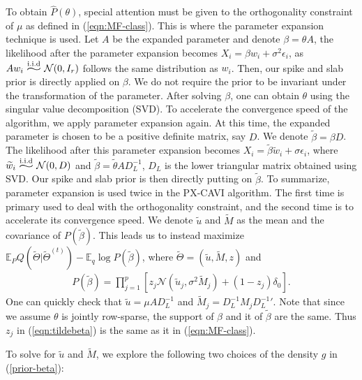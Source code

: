 \documentclass[pdftex, noinfoline, letter]{imsart}
\newcommand{\widesim}[2][2]{
	\mathrel{\overset{#2}{\scalebox{#1}[1]{$\sim$}}}
}
\theoremstyle{plain}
\begin{document}
To obtain $\widehat P(\theta)$, special attention must be given to the orthogonality constraint of $\mu$ as defined in (\ref{eqn:MF-class}). This is where the parameter expansion technique is used. Let $A$ be the expanded parameter and denote $\beta = \theta A$, the likelihood after the parameter expansion becomes $X_i = \beta w_i + \sigma^2 \epsilon_i$, as $A w_i \widesim{\text{i.i.d}} \mathcal{N}(0, I_r)$ follows the same distribution as $w_i$. Then, our spike and slab prior is directly applied on $\beta$. We do not require the prior to be invariant under the transformation of the parameter. 
After solving $\beta$, one can obtain $\theta$ using the singular value decomposition (SVD). 
To accelerate the convergence speed of the algorithm, we apply parameter expansion again. At this time, the expanded parameter is chosen to be a positive definite matrix, say $D$. 
We denote $\widetilde  \beta = \beta D$. The likelihood after this parameter expansion becomes 
$X_i = \widetilde  \beta \widetilde  w_i + \sigma \epsilon_i$, where $\widetilde  w_i \widesim{\text{i.i.d}} \mathcal{N}(0, D)$ and $\widetilde  \beta = \widetilde  \theta A D_L^{-1}$, $D_L$ is the lower triangular matrix obtained using SVD. 
Our spike and slab prior is then directly putting on $\widetilde  \beta$. 
To summarize, parameter expansion is used twice in the PX-CAVI algorithm. The first time is primary used to deal with the orthogonality constraint, and the second time is to accelerate its convergence speed. We denote $\widetilde  u$ and $\widetilde  M$ as the mean and the covariance of $P(\widetilde  \beta)$. This leads us to  instead maximize $\mathbb{E}_P Q(\widetilde  \Theta|\widetilde  \Theta^{(t)}) - \mathbb{E}_{q} \log P(\widetilde  \beta)$, where 
$\widetilde  \Theta = (\widetilde  u, \widetilde  M, z)$ and 
\begin{align}
\label{eqn:tildebeta}
        P(\widetilde  \beta) = \prod_{j=1}^p 
        \left[
            z_j\mathcal{N}(\widetilde  u_j, \sigma^2 \widetilde  M_j) + (1-z_j) \delta_0
        \right].
\end{align}
One can quickly check that $\widetilde  u = \mu A D_L^{-1}$ and $\widetilde  M_j = D_L^{-1}  M_j {D_L^{-1}}'$. 
Note that since we assume $\theta$ is jointly row-sparse, the support of $\beta$ and it of $\widetilde  \beta$ are the same. Thus $z_j$ in (\ref{eqn:tildebeta}) is the same as it in (\ref{eqn:MF-class}).

To solve for $\widetilde u$ and $\widetilde M$, we explore the following two choices of the density $g$ in (\ref{prior-beta}):
\end{document}
